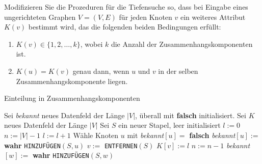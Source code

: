 
\begin{exercise}

\phantom{}

	Modifizieren Sie die Prozeduren für die Tiefensuche so, dass bei Eingabe eines ungerichteten Graphen $V = (V, E)$ für jeden Knoten $v$ ein weiteres Attribut $K(v)$ bestimmt wird, das die folgenden beiden Bedingungen erfüllt:
	\begin{enumerate}[label = (\alph*)]
		\item $K(v) \in \{1,2,\dots,k\}$, wobei $k$ die Anzahl der Zusammenhangskomponenten ist.
		
		\item $K(u) = K(v)$ genau dann, wenn $u$ und $v$ in der selben Zusammenhangskomponente liegen. 
	\end{enumerate}
	

\end{exercise}


\begin{solution}

\phantom{}

	\begin{algorithm}
		\caption{Einteilung in Zusammenhangskomponenten}
		\begin{algorithmic}[1]
			\State Sei \textit{bekannt} neues Datenfeld der Länge $|V|$, überall mit \textbf{falsch} initialisiert.
			\State Sei $K$ neues Datenfeld der Länge $|V|$
			\State Sei $S$ ein neuer Stapel, leer initialisiert
			\State $l := 0$
			\State $n := |V| - 1$
			\State $l := l + 1$
			\State Wähle Knoten $u$ mit \textit{bekannt}$[u] =$ \textbf{falsch}
			\State \textit{bekannt}$[u] :=$ \textbf{wahr}
			\State \verb|HINZUFÜGEN|$(S,u)$ 
			\State $v :=$ \verb|ENTFERNEN|$(S)$
			\State $K[v] := l$
			\State $n := n - 1$
			\State  \textit{bekannt}$[w] :=$ \textbf{wahr}
			\State \verb|HINZUFÜGEN|$(S,w)$
			\EndIf
			\EndFor
			\EndWhile
			\EndWhile
			\EndProcedure
		\end{algorithmic}
	\end{algorithm}

\end{solution}

